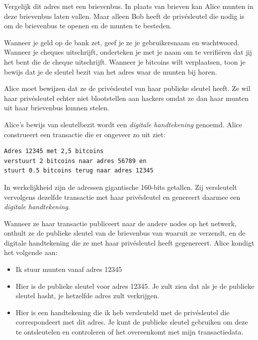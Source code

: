 \documentclass[smalldemyvopaper,11pt,twoside,onecolumn,openright,extrafontsizes]{memoir}
\begin{document}
Vergelijk dit adres met een brievenbus. In plaats van brieven kan Alice munten in deze brievenbus laten vallen. Maar alleen Bob heeft de privésleutel die nodig is om de brievenbus te openen en de munten te besteden.

Wanneer je geld op de bank zet, geef je ze je gebruikersnaam en wachtwoord. Wanneer je cheques uitschrijft, onderteken je met je naam om te verifiëren dat jij het bent die de cheque uitschrijft. Wanneer je bitcoins wilt verplaatsen, toon je bewijs dat je de sleutel bezit van het adres waar de munten bij horen.

Alice moet bewijzen dat ze de privésleutel van haar publieke sleutel heeft. Ze wil haar privésleutel echter niet blootstellen aan hackers omdat ze dan haar munten uit haar brievenbus kunnen stelen.

Alice's bewijs van sleutelbezit wordt een \textit{digitale handtekening} genoemd. Alice construeert een transactie die er ongeveer zo uit ziet:

\begin{verbatim}
Adres 12345 met 2,5 bitcoins 
verstuurt 2 bitcoins naar adres 56789 en 
stuurt 0.5 bitcoins terug naar adres 12345
\end{verbatim}

In werkelijkheid zijn de adressen gigantische 160-bits getallen. Zij versleutelt vervolgens dezelfde transactie met haar privésleutel en genereert daarmee een \textit{digitale handtekening}.

Wanneer ze haar transactie publiceert naar de andere nodes op het netwerk, onthult ze de publieke sleutel van de brievenbus van waaruit ze verzendt, en de digitale handtekening die ze met haar privésleutel heeft gegenereert. Alice kondigt het volgende aan:

\begin{itemize}
    \item Ik stuur munten vanaf adres 12345
    \item Hier is de publieke sleutel voor adres 12345. Je zult zien dat als je de publieke sleutel hasht, je hetzelfde adres zult verkrijgen.
    \item Hier is een handtekening die ik heb versleuteld met de privésleutel die correspondeert met dit adres. Je kunt de publieke sleutel gebruiken om deze te ontsleutelen en controleren of het overeenkomt met mijn transactiedata.
\end{itemize}
\end{document}
